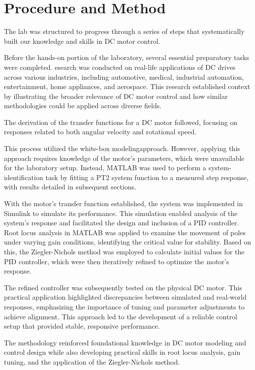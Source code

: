 \section{Procedure and Method}

The lab was structured to progress through a series of steps that systematically built our knowledge and 
skills in DC motor control. 

Before the hands-on portion of the laboratory, several essential preparatory tasks were completed. 
esearch was conducted on real-life applications of DC drives across various industries, including 
automotive, medical, industrial automation, entertainment, home appliances, and aerospace. 
This research established context by illustrating the broader relevance of DC motor control 
and how similar methodologies could be applied across diverse fields.

The derivation of the transfer functions for a DC motor followed, focusing on responses related to both 
angular velocity and rotational speed.

This process utilized the \grqq white-box modeling\grqq approach. However, applying this approach requires 
knowledge of the motor's parameters, which were unavailable for the laboratory setup. Instead, MATLAB was 
used to perform a system-identification task by fitting a PT2 system function to a measured step response, 
with results detailed in subsequent sections.

With the motor’s transfer function established, the system was implemented in Simulink to simulate its 
performance. This simulation enabled analysis of the system’s response and facilitated the design and 
inclusion of a PID controller. Root locus analysis in MATLAB was applied to examine the movement of poles 
under varying gain conditions, identifying the critical value for stability. Based on this, the Ziegler-Nichols 
method was employed to calculate initial values for the PID controller, which were then iteratively refined to 
optimize the motor’s response.

The refined controller was subsequently tested on the physical DC motor. This practical application 
highlighted discrepancies between simulated and real-world responses, emphasizing the importance of 
tuning and parameter adjustments to achieve alignment. This approach led to the development of a reliable 
control setup that provided stable, responsive performance.

The methodology reinforced foundational knowledge in DC motor modeling and control design while also 
developing practical skills in root locus analysis, gain tuning, and the application of the Ziegler-Nichols method.



